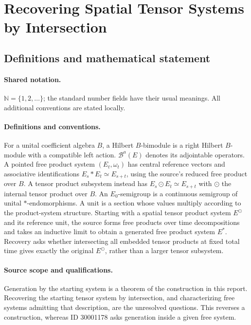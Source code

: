 \documentclass[11pt]{article}
\begin{document}
\section{Recovering Spatial Tensor Systems by Intersection}\label{statement}

\subsection{Definitions and mathematical statement}

\paragraph{Shared notation.}$\mathbb N=\{1,2,\ldots\}$; the standard number fields have their usual meanings. All additional conventions are stated locally.


\paragraph{Definitions and conventions.} For a unital coefficient algebra $B$, a Hilbert $B$-bimodule is a right Hilbert $B$-module with a compatible left action. $\mathcal B^a(E)$ denotes its adjointable operators. A pointed free product system $(E_t,\omega_t)$ has central reference vectors and associative identifications $E_s*E_t\simeq E_{s+t}$, using the source's reduced free product over $B$. A tensor product subsystem instead has $E_s\odot E_t\simeq E_{s+t}$ with $\odot$ the internal tensor product over $B$. An $E_0$-semigroup is a continuous semigroup of unital $*$-endomorphisms. A unit is a section whose values multiply according to the product-system structure. Starting with a spatial tensor product system $E^\odot$ and its reference unit, the source forms free products over time decompositions and takes an inductive limit to obtain a generated free product system $E^*$. Recovery asks whether intersecting all embedded tensor products at fixed total time gives exactly the original $E^\odot$, rather than a larger tensor subsystem.

\paragraph{Source scope and qualifications.} Generation by the starting system is a theorem of the construction in this report. Recovering the starting tensor system by intersection, and characterizing free systems admitting that description, are the unresolved questions. This reverses a construction, whereas ID 30001178 asks generation inside a given free system.
\end{document}
